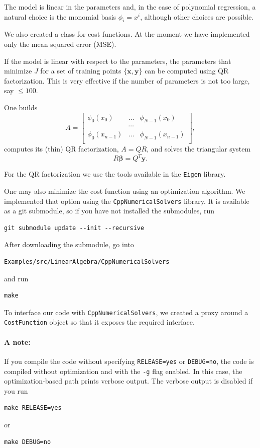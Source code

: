 \documentclass{article}
\begin{document}
The model is linear in the parameters and, in the case of polynomial regression, a natural choice is the monomial basis $\phi_i=x^i$, although other choices are possible.

We also created a class for cost functions. At the moment we have implemented only the mean squared error (MSE).

If the model is linear with respect to the parameters, the parameters that minimize $J$ for a set of training points $\{\mathbf{x},\mathbf{y}\}$ can be computed using QR factorization. This is very effective if the number of parameters is not too large, say $\le 100$.

One builds
\[
  A=\begin{bmatrix}
    \phi_0(x_0)&\ldots&\phi_{N-1}(x_0)\\
    &\cdots &\\
    \phi_0(x_{n-1})&\ldots&\phi_{N-1}(x_{n-1})\\
  \end{bmatrix},
\]
computes its (thin) QR factorization, $A=QR$, and solves the triangular system
\[
  R\boldsymbol{\beta}=Q^T\mathbf{y}.
\]

For the QR factorization we use the tools available in the \texttt{Eigen} library.

One may also minimize the cost function using an optimization algorithm. We implemented that option using the \texttt{CppNumericalSolvers} library. It is available as a git submodule, so if you have not installed the submodules, run
\begin{verbatim}
git submodule update --init --recursive
\end{verbatim}

After downloading the submodule, go into
\begin{verbatim}
Examples/src/LinearAlgebra/CppNumericalSolvers
\end{verbatim}
and run
\begin{verbatim}
make
\end{verbatim}

To interface our code with \texttt{CppNumericalSolvers}, we created a proxy around a \texttt{CostFunction} object so that it exposes the required interface.

\paragraph{A note:} If you compile the code without specifying \texttt{RELEASE=yes} or \texttt{DEBUG=no}, the code is compiled without optimization and with the \texttt{-g} flag enabled. In this case, the optimization-based path prints verbose output. The verbose output is disabled if you run
\begin{verbatim}
make RELEASE=yes
\end{verbatim}
or
\begin{verbatim}
make DEBUG=no
\end{verbatim}
\end{document}
